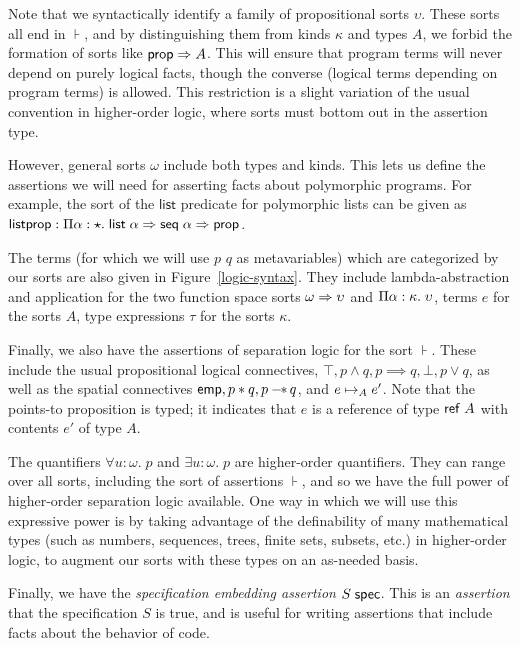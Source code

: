 Note that we syntactically identify a family of propositional sorts
$\upsilon$. These sorts all end in $\assert$, and by distinguishing
them from kinds $\kappa$ and types $A$, we forbid the formation of
sorts like $\mathsf{prop} \Rightarrow A$. This will ensure that program terms will
never depend on purely logical facts, though the converse (logical
terms depending on program terms) is allowed. This restriction is a
slight variation of the usual convention in higher-order logic, where
sorts must bottom out in the assertion type.

However, general sorts $\omega$ include both types and kinds. This
lets us define the assertions we will need for asserting facts about
polymorphic programs. For example, the sort of the $\mathsf{list}$
predicate for polymorphic lists can be given as $\mathsf{listprop} :
\Pi {\alpha}:{\star}.\;{\mathsf{list}\;{\alpha} \Rightarrow \mathsf{seq}\;{\alpha} \Rightarrow
  \mathsf{prop}}$.

The terms (for which we will use $p$ $q$ as metavariables) which are
categorized by our sorts are also given in Figure~\ref{logic-syntax}.
They include lambda-abstraction and application for the two function
space sorts $\omega \Rightarrow \upsilon$ and
$\Pi {\alpha}:{\kappa}.\;{\upsilon}$, terms $e$ for the sorts $A$,
type expressions $\tau$ for the sorts $\kappa$.

Finally, we also have the assertions of separation logic for the sort
$\assert$.  These include the usual propositional logical connectives,
$\top, p \land q, p \implies q, \bot, p \vee q$, as well as the
spatial connectives $\mathsf{emp}, p * q, p -\!\!*\, q$, and $e \mapsto_A
e'$. Note that the points-to proposition is typed; it indicates that
$e$ is a reference of type $\mathsf{ref}\;A$ with contents $e'$ of type
$A$.

The quantifiers $\forall u:\omega.\; p$ and $\exists u:\omega.\; p$
are higher-order quantifiers. They can range over all sorts, including
the sort of assertions $\assert$, and so we have the full power of
higher-order separation logic available.  One way in which we will use
this expressive power is by taking advantage of the definability of
many mathematical types (such as numbers, sequences, trees, finite
sets, subsets, etc.) in higher-order logic, to augment our sorts with
these types on an as-needed basis.

Finally, we have the \emph{specification embedding assertion}
${S}\;\mathsf{spec}$.  This is an \emph{assertion} that the specification
$S$ is true, and is useful for writing assertions that include facts
about the behavior of code.

